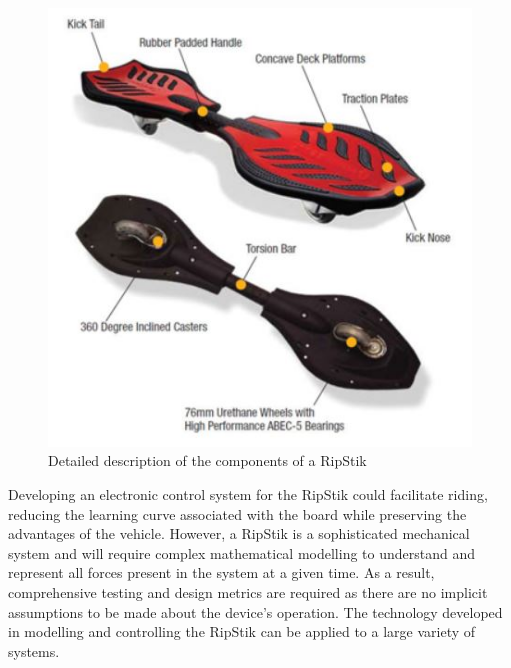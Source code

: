 \documentclass[12pt,letterpaper]{article}
\begin{document}
\begin{figure}[!htb]
	\centering
	\includegraphics[width=\linewidth]{RipStik.JPG}
	\caption{Detailed description of the components of a RipStik \cite{PIC}}\label{fig:RipStik}
	\endminipage
\end{figure}
\par
Developing an electronic control system for the RipStik could facilitate riding, reducing the learning curve associated with the board while preserving the advantages of the vehicle.
However, a RipStik is a sophisticated mechanical system and will require complex mathematical modelling to understand and represent all forces present in the system at a given time. 
As a result, comprehensive testing and design metrics are required as there are no implicit assumptions to be made about the device's operation. 
The technology developed in modelling and controlling the RipStik can be applied to a large variety of systems. 
\end{document}
